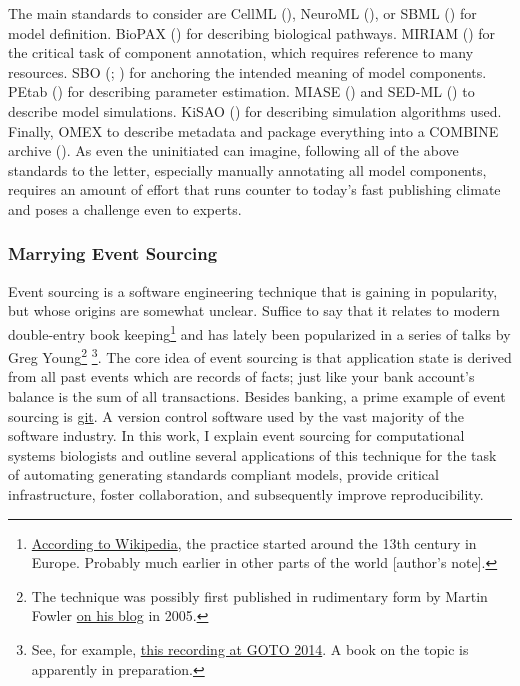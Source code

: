 \documentclass[
  a4paper,
]{scrartcl}
\begin{document}
The main standards to consider are CellML
(), NeuroML
(), or SBML
() for model
definition. BioPAX ()
for describing biological pathways. MIRIAM
() for the
critical task of component annotation, which requires reference to many
resources. SBO (; ) for anchoring the
intended meaning of model components. PEtab
() for describing parameter estimation. MIASE
() and SED-ML () to describe model simulations. KiSAO
() for
describing simulation algorithms used. Finally, OMEX to describe
metadata and package everything into a COMBINE archive
(). As even
the uninitiated can imagine, following all of the above standards to the
letter, especially manually annotating all model components, requires an
amount of effort that runs counter to today's fast publishing climate
and poses a challenge even to experts.

\subsubsection{Marrying Event Sourcing}\label{marrying-event-sourcing}

Event sourcing is a software engineering technique that is gaining in
popularity, but whose origins are somewhat unclear. Suffice to say that
it relates to modern double-entry book keeping\footnote{\href{https://en.wikipedia.org/wiki/Double-entry_bookkeeping\#History}{According
  to Wikipedia}, the practice started around the 13th century in Europe.
  Probably much earlier in other parts of the world {[}author's note{]}.}
and has lately been popularized in a series of talks by Greg
Young\footnote{The technique was possibly first published in rudimentary
  form by Martin Fowler
  \href{https://martinfowler.com/eaaDev/EventSourcing.html}{on his blog}
  in 2005.} \footnote{See, for example,
  \href{https://www.youtube.com/watch?v=8JKjvY4etTY}{this recording at
  GOTO 2014}. A book on the topic is apparently in preparation.}. The
core idea of event sourcing is that application state is derived from
all past events which are records of facts; just like your bank
account's balance is the sum of all transactions. Besides banking, a
prime example of event sourcing is \href{https://git-scm.com/}{git}. A
version control software used by the vast majority of the software
industry. In this work, I explain event sourcing for computational
systems biologists and outline several applications of this technique
for the task of automating generating standards compliant models,
provide critical infrastructure, foster collaboration, and subsequently
improve reproducibility.
\end{document}
